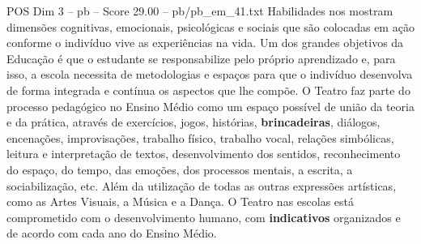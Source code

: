 \begin{textsample}{POS Dim 3 – pb – Score 29.00 – pb/pb\_em\_41.txt}
Habilidades nos mostram dimensões cognitivas, emocionais, psicológicas e sociais que são colocadas em ação conforme o indivíduo vive as experiências na vida.
Um dos grandes objetivos da Educação é que o estudante se responsabilize pelo próprio aprendizado e, para isso, a escola necessita de metodologias e espaços para que o indivíduo desenvolva de forma integrada e contínua os aspectos que lhe compõe.
O Teatro faz parte do processo pedagógico no Ensino Médio como um espaço possível de união da teoria e da prática, através de exercícios, jogos, histórias, \textbf{brincadeiras}, diálogos, encenações, improvisações, trabalho físico, trabalho vocal, relações simbólicas, leitura e interpretação de textos, desenvolvimento dos sentidos, reconhecimento do espaço, do tempo, das emoções, dos processos mentais, a escrita, a sociabilização, etc.
Além da utilização de todas as outras expressões artísticas, como as Artes Visuais, a Música e a Dança.
O Teatro nas escolas está comprometido com o desenvolvimento humano, com \textbf{indicativos} organizados e de acordo com cada ano do Ensino Médio.

\end{textsample}
